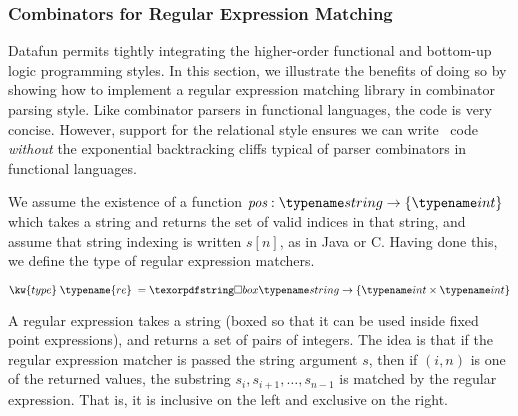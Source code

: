 \subsubsection{Combinators for Regular Expression Matching}

\newcommand\tre{\typename{re}}

Datafun permits tightly integrating the higher-order functional and
bottom-up logic programming styles. In this section, we illustrate the
benefits of doing so by showing how to implement a regular expression
matching library in combinator parsing style.  Like combinator parsers
in functional languages, the code is very concise.  However, support
for the relational style ensures we can write \naive\ code
\emph{without} the exponential backtracking cliffs typical of parser
combinators in functional languages.

We assume the existence of a function $\name{pos} : \tstring \to \tset{\tint}$
which takes a string and returns the set of valid indices in that string, and
assume that string indexing is written $s[n]$, as in Java or C. Having done
this, we define the type of regular expression matchers.

\begin{tabbing}
\qquad  $\kw{type}\;\tre\;=\iso \tstring \to \tset{\tint \times \tint}$
\end{tabbing}

A regular expression takes a string (boxed so that it can be used inside fixed
point expressions), and returns a set of pairs of integers. The idea is that if
the regular expression matcher is passed the string argument $s$, then if $(i,
n)$ is one of the returned values, the substring $s_i, s_{i+1}, \ldots, s_{n-1}$
is matched by the regular expression. That is, it is inclusive on the left and
exclusive on the right.

